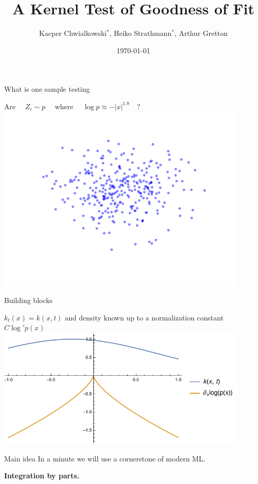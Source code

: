 \documentclass{beamer}
\title{ A Kernel Test of Goodness of Fit}
\date{\today}
\author{Kacper Chwialkowski$^*$, Heiko Strathmann$^*$, Arthur Gretton}
\institute{}
\begin{document}
\frame{\titlepage}
 \begin{frame}{What is one sample testing }
 \begin{center}
Are $\quad Z_i \sim p \quad$ where $\quad \log p \approx -|x|^{1.8} \quad$?\\
 \includegraphics[width=0.9\textwidth]{./img/mixtureOfNormal.pdf} 
 \end{center}
 
 \end{frame} 
  \begin{frame}{Building blocks}
\begin{center}
$k_t(x) = k(x,t)$ and density known up to a normalization constant $C \log' p(x)$
 \includegraphics[width=0.9\textwidth]{./img/kp.pdf} 
 \end{center}

 
 \end{frame} 
  \begin{frame}{Main idea}
In a minute we will use a cornerstone of modern ML.

\bf{Integration by parts.}
 \end{frame} 
\end{document}
